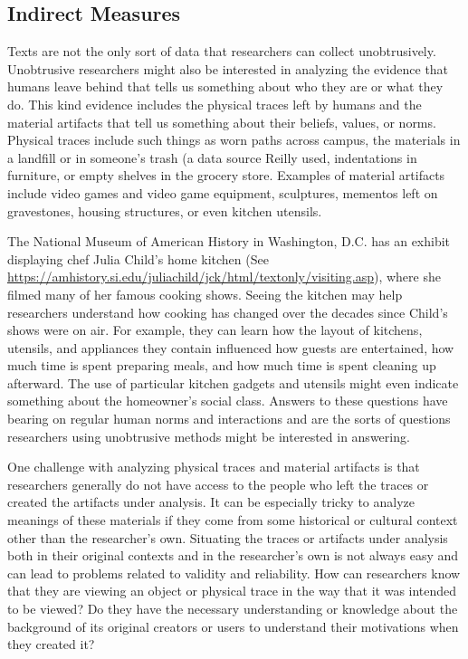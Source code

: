 \subsection{Indirect Measures}

Texts are not the only sort of data that researchers can collect unobtrusively. Unobtrusive researchers might also be interested in analyzing the evidence that humans leave behind that tells us something about who they are or what they do. This kind evidence includes the physical traces left by humans and the material artifacts that tell us something about their beliefs, values, or norms. Physical traces include such things as worn paths across campus, the materials in a landfill or in someone's trash (a data source Reilly used\cite{reilly1987comparison}, indentations in furniture, or empty shelves in the grocery store. Examples of material artifacts include video games and video game equipment, sculptures, mementos left on gravestones, housing structures, or even kitchen utensils.

The National Museum of American History in Washington, D.C. has an exhibit displaying chef Julia Child's home kitchen (See \url{https://amhistory.si.edu/juliachild/jck/html/textonly/visiting.asp}), where she filmed many of her famous cooking shows. Seeing the kitchen may help researchers understand how cooking has changed over the decades since Child's shows were on air. For example, they can learn how the layout of kitchens, utensils, and appliances they contain influenced how guests are entertained, how much time is spent preparing meals, and how much time is spent cleaning up afterward. The use of particular kitchen gadgets and utensils might even indicate something about the homeowner's social class. Answers to these questions have bearing on regular human norms and interactions and are the sorts of questions researchers using unobtrusive methods might be interested in answering.

One challenge with analyzing physical traces and material artifacts is that researchers generally do not have access to the people who left the traces or created the artifacts under analysis. It can be especially tricky to analyze meanings of these materials if they come from some historical or cultural context other than the researcher's own. Situating the traces or artifacts under analysis both in their original contexts and in the researcher's own is not always easy and can lead to problems related to validity and reliability. How can researchers know that they are viewing an object or physical trace in the way that it was intended to be viewed? Do they have the necessary understanding or knowledge about the background of its original creators or users to understand their motivations when they created it?

